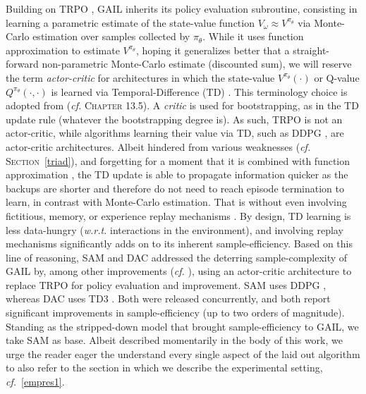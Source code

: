 Building on TRPO \cite{Schulman2015-jt}, GAIL \cite{Ho2016-bv} inherits its
policy evaluation subroutine,
consisting in learning a parametric estimate of the state-value function
$V_\omega \approx V^{\pi_\theta}$ via Monte-Carlo estimation
over samples collected by $\pi_\theta$.
While it uses function approximation
to estimate $V^{\pi_\theta}$, hoping it generalizes better
that a straight-forward non-parametric Monte-Carlo estimate (discounted sum),
we will reserve the term \emph{actor-critic} for architectures in which the
state-value $V^{\pi_\theta}(\cdot)$ or Q-value $Q^{\pi_\theta}(\cdot, \cdot)$ is learned
via Temporal-Difference (TD) \cite{Sutton1988-to}.
This terminology choice is adopted from \cite{Sutton1998-ow}
(\textit{cf.} \textsc{Chapter} 13.5).
A \emph{critic} is used for bootstrapping, as in the TD update rule
(whatever the bootstrapping degree is).
As such, TRPO is not an actor-critic, while algorithms learning their value via TD,
such as DDPG \cite{Silver2014-dk,Lillicrap2016-xa}, are actor-critic architectures.
Albeit hindered from various weaknesses (\textit{cf.} \textsc{Section}~\ref{triad}),
and forgetting for a moment
that it is combined with function approximation \cite{Sutton1999-ii,Silver2014-dk},
the TD update is able to propagate information quicker as the backups are shorter and
therefore do not need to reach episode termination to learn, in contrast with
Monte-Carlo estimation.
That is without even involving fictitious, memory,
or experience replay mechanisms \cite{Lin1992-pp}.
By design, TD learning is less data-hungry
(\textit{w.r.t.} interactions in the environment),
and involving replay mechanisms \cite{Lin1992-pp,Lillicrap2016-xa,Wang2016-mp}
significantly adds on to its inherent sample-efficiency.
Based on this line of reasoning, SAM \cite{Blonde2019-vc} and DAC \cite{Kostrikov2019-jo}
addressed the deterring sample-complexity of GAIL by,
among other improvements (\textit{cf.} \cite{Blonde2019-vc,Kostrikov2019-jo}),
using an actor-critic architecture to replace TRPO for policy evaluation and improvement.
SAM \cite{Blonde2019-vc} uses DDPG \cite{Lillicrap2016-xa},
whereas DAC \cite{Kostrikov2019-jo} uses TD3 \cite{Fujimoto2018-pe}.
Both were released concurrently, and both report significant improvements in sample-efficiency
(up to two orders of magnitude).  %
Standing as the stripped-down model that brought sample-efficiency to GAIL,
we take SAM as base.
Albeit described momentarily in the body of this work,
we urge the reader eager the understand every single aspect of the laid out algorithm to also refer to
the section in which we describe the experimental setting, \textit{cf.}~\ref{empres1}.

